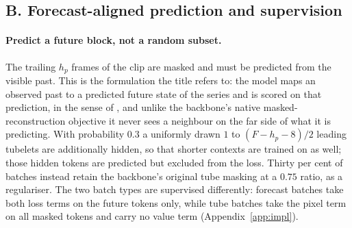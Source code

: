 \subsection{B. Forecast-aligned prediction and supervision}
\label{sec:objective}

\paragraph{Predict a future block, not a random subset.} The trailing $h_p$ frames of the clip are
masked and must be predicted from the visible past. This is the formulation the title refers to: the model
maps an observed past to a predicted future state of the series and is scored on that prediction, in
the sense of \citet{lecun2022}, and unlike the backbone's native masked-reconstruction objective it
never sees a neighbour on the far side of what it is predicting. With probability $0.3$ a uniformly drawn $1$ to $(F-h_p-8)/2$
leading tubelets are additionally hidden, so that shorter contexts are trained on as well; those
hidden tokens are predicted but excluded from the loss. Thirty per cent of batches instead retain the
backbone's original tube masking at a $0.75$ ratio, as a regulariser. The two batch types are
supervised differently: forecast batches take both loss terms on the future tokens only, while tube
batches take the pixel term on all masked tokens and carry no value term (Appendix~\ref{app:impl}).

